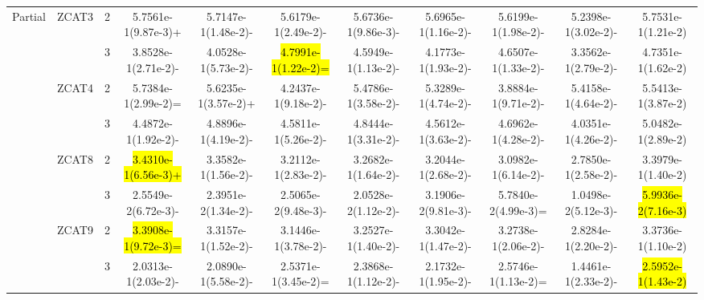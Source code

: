 \documentclass[a4paper,fleqn]{cas-dc}
\newcommand{\highlight}[1]{
	\begingroup
	\sethlcolor{Seashell}%
	\hl{#1}%
	\endgroup
}
\begin{document}
\begin{sloppypar}
\begin{table}[ht]
{\begin{tabular}{ccccccccccc}
					
					
					
					\multirow{8}{*}{Partial}&\multirow{2}{*}{ZCAT3}&2&5.7561e-1(9.87e-3)+		&5.7147e-1(1.48e-2)-	&5.6179e-1(2.49e-2)-	&5.6736e-1(9.86e-3)-	&5.6965e-1(1.16e-2)-	&5.6199e-1(1.98e-2)-	&5.2398e-1(3.02e-2)-	&5.7531e-1(1.21e-2)\\
					
					\multirow{8}{*}{~}&\multirow{2}{*}{~}&3	&3.8528e-1(2.71e-2)-		&4.0528e-1(5.73e-2)-	&\highlight{4.7991e-1(1.22e-2)=}	&4.5949e-1(1.13e-2)-	&4.1773e-1(1.93e-2)-	&4.6507e-1(1.33e-2)-	&3.3562e-1(2.79e-2)-	&4.7351e-1(1.62e-2)\\
					
					\multirow{8}{*}{~}&\multirow{2}{*}{ZCAT4}&2	&5.7384e-1(2.99e-2)=		&5.6235e-1(3.57e-2)+	&4.2437e-1(9.18e-2)-	&5.4786e-1(3.58e-2)-	&5.3289e-1(4.74e-2)-	&3.8884e-1(9.71e-2)-	&5.4158e-1(4.64e-2)-	&5.5413e-1(3.87e-2)\\
					
					\multirow{8}{*}{~}&\multirow{2}{*}{~}&3	&4.4872e-1(1.92e-2)-		&4.8896e-1(4.19e-2)-	&4.5811e-1(5.26e-2)-	&4.8444e-1(3.31e-2)-	&4.5612e-1(3.63e-2)-	&4.6962e-1(4.28e-2)-	&4.0351e-1(4.26e-2)-	&5.0482e-1(2.89e-2)\\
					
					
					
					
					
					
					
					
					\multirow{8}{*}{~}&\multirow{2}{*}{ZCAT8}&2  &\highlight{3.4310e-1(6.56e-3)+}		&3.3582e-1(1.56e-2)-	&3.2112e-1(2.83e-2)-	&3.2682e-1(1.64e-2)-	&3.2044e-1(2.68e-2)-	&3.0982e-1(6.14e-2)-	&2.7850e-1(2.58e-2)-	&3.3979e-1(1.40e-2)\\
					
					\multirow{8}{*}{~}&\multirow{2}{*}{~}&3	&2.5549e-2(6.72e-3)-		&2.3951e-2(1.34e-2)-	&2.5065e-2(9.48e-3)-	&2.0528e-2(1.12e-2)-	&3.1906e-2(9.81e-3)-	&5.7840e-2(4.99e-3)=	&1.0498e-2(5.12e-3)-	&\highlight{5.9936e-2(7.16e-3)}\\
					
					
					\multirow{8}{*}{~}&\multirow{2}{*}{ZCAT9}&2			&\highlight{3.3908e-1(9.72e-3)=}		&3.3157e-1(1.52e-2)-	&3.1446e-1(3.78e-2)-	&3.2527e-1(1.40e-2)-	&3.3042e-1(1.47e-2)-	&3.2738e-1(2.06e-2)-	&2.8284e-1(2.20e-2)-	&3.3736e-1(1.10e-2)\\
					
					\multirow{8}{*}{~}&\multirow{2}{*}{~}&3		&2.0313e-1(2.03e-2)-		&2.0890e-1(5.58e-2)-	&2.5371e-1(3.45e-2)=	&2.3868e-1(1.12e-2)-	&2.1732e-1(1.95e-2)-	&2.5746e-1(1.13e-2)=	&1.4461e-1(2.33e-2)-	&\highlight{2.5952e-1(1.43e-2)}\\
					\hline
					

\end{tabular}}
\end{table}
\end{sloppypar}
\end{document}
